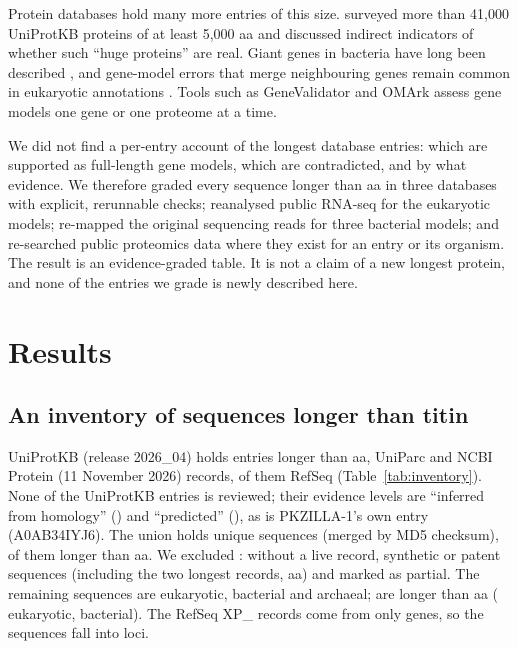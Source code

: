 \documentclass[11pt]{article}
\begin{document}
Protein databases hold many more entries of this size. \citet{amaral2024} surveyed more than 41,000 UniProtKB proteins
of at least 5,000 aa and discussed indirect indicators of whether such ``huge proteins'' are real. Giant genes in bacteria
have long been described \citep{reva2008}, and gene-model errors that merge neighbouring genes remain common in
eukaryotic annotations \citep{bachler2025}. Tools such as GeneValidator \citep{dragan2016} and OMArk \citep{nevers2025}
assess gene models one gene or one proteome at a time.

We did not find a per-entry account of the longest database entries: which are supported as full-length gene models,
which are contradicted, and by what evidence. We therefore graded every sequence longer than  aa in three
databases with explicit, rerunnable checks; reanalysed public RNA-seq for the eukaryotic models; re-mapped the original
sequencing reads for three bacterial models; and re-searched public proteomics data where they exist for an entry or its
organism. The result is an evidence-graded table. It is not a claim of a new longest protein, and none of the entries we
grade is newly described here.

\section{Results}

\subsection{An inventory of  sequences longer than titin}

UniProtKB (release 2026\_04) holds  entries longer than  aa, UniParc
 and NCBI Protein (11 November 2026)  records,  of them RefSeq
(Table~\ref{tab:inventory}). None of the UniProtKB entries is reviewed; their evidence levels are ``inferred from
homology'' () and ``predicted'' (), as is PKZILLA-1's own entry (A0AB34IYJ6).
The union holds  unique sequences (merged by MD5 checksum),  of them longer than
 aa. We excluded :  without a live record,  synthetic or patent
sequences (including the two longest records,  aa) and  marked as partial. The
remaining  sequences are  eukaryotic,  bacterial and  archaeal;
 are longer than  aa ( eukaryotic,  bacterial). The
 RefSeq XP\_ records come from only  genes, so the sequences fall into
 loci.
\end{document}
